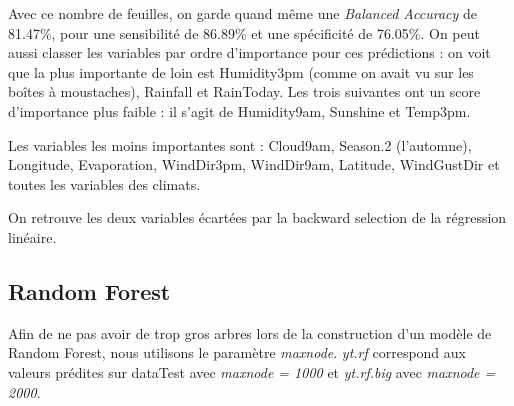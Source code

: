\documentclass{article}
\begin{document}
Avec ce nombre de feuilles, on garde quand même une \emph{Balanced Accuracy} de 81.47\%, pour une sensibilité de 86.89\% et une spécificité de 76.05\%. On peut aussi classer les variables par ordre d'importance pour ces prédictions : on voit que la plus importante de loin est Humidity3pm (comme on avait vu sur les boîtes à moustaches), Rainfall et RainToday. Les trois suivantes ont un score d'importance plus faible : il s'agit de Humidity9am, Sunshine et Temp3pm.

Les variables les moins importantes sont : Cloud9am, Season.2 (l'automne), Longitude, Evaporation, WindDir3pm, WindDir9am, Latitude, WindGustDir et toutes les variables des climats.

On retrouve les deux variables écartées par la backward selection de la régression linéaire. 

\subsection{Random Forest}

Afin de ne pas avoir de trop gros arbres lors de la construction d'un modèle de Random Forest, nous utilisons le paramètre \emph{maxnode}. \emph{yt.rf} correspond aux valeurs prédites sur dataTest avec \emph{maxnode = 1000} et \emph{yt.rf.big} avec \emph{maxnode = 2000}. 
\end{document}
